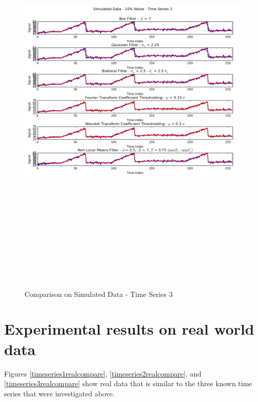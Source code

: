 \documentclass[11pt]{article}
\theoremstyle{definition}
\begin{document}
\begin{figure}[h!]
\centering
\includegraphics[width = 1 \textwidth,height = 8in]{TimeSeries3SimulatedCompare.png}
\caption{Comparison on Simulated Data - Time Series 3}
\label{timeseries3simulatedcompare}
\end{figure}

\section{Experimental results on real world data}
\label{results2}

Figures \ref{timeseries1realcompare}, \ref{timeseries2realcompare},
and \ref{timeseries3realcompare} show real data that is similar to the
three known time series that were investigated above.
\end{document}
